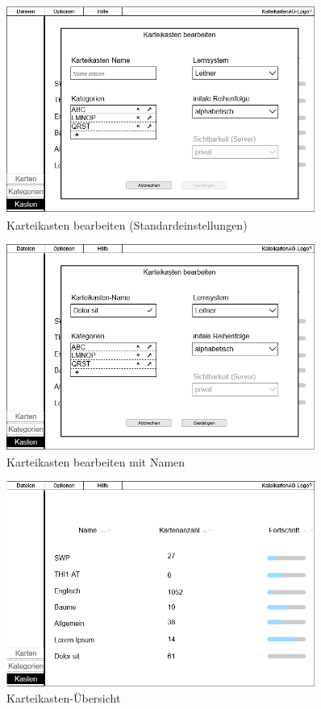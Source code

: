 \documentclass[fontsize=12pt,paper=a4,twoside]{scrartcl}
\begin{document}
\begin{figure}
	\centering
	\caption{Karteikasten bearbeiten (Standardeinstellungen)}
	\label{fig:cat_deck_4}
	\includegraphics[width=0.9\textwidth]{mockup_categories_deck_4.png}
\end{figure}
\begin{figure}
	\centering
	\caption{Karteikasten bearbeiten mit Namen}
	\label{fig:cat_deck_5}
	\includegraphics[width=0.9\textwidth]{mockup_categories_deck_5.png}
\end{figure}
\begin{figure}
	\centering
	\caption{Karteikasten-Übersicht}
	\label{fig:cat_deck_6}
	\includegraphics[width=0.9\textwidth]{mockup_categories_deck_6.png}
\end{figure}
\end{document}
